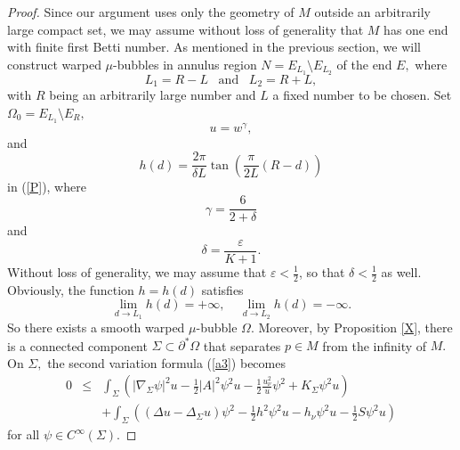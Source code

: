 \documentclass[10pt,a4paper]{amsart}
\numberwithin{equation}{section}
\begin{document}
\begin{proof}
Since our argument uses only the geometry of $M$ outside an arbitrarily large compact
set, we may assume without loss of generality that $M$ has one end with
finite first Betti number.
As mentioned in the previous section, we will construct warped
$\mu$-bubbles in annulus region $N=E_{L_1}\setminus E_{L_2}$ of the end $E,$
where $$L_1=R-L \;\;\;\text{and}\;\;\; L_2=R+L,$$ with $R$ being an arbitrarily large number and $L$ a fixed number
to be chosen. Set $\Omega_0=E_{L_1}\setminus E_{R},$ $$u=w^{\gamma },$$ and 
\begin{equation*}
h\left( d\right) =\frac{2\pi }{\delta L}\tan \left( \frac{\pi }{2L}(R-d)\right)
\end{equation*} 
in (\ref{P}), where 
\begin{equation*}
\gamma =\frac{6}{2+\delta }
\end{equation*}
and 
\begin{equation*}
\delta =\frac{\varepsilon }{K+1}.
\end{equation*}
Without loss of generality, we may assume that $\varepsilon<\frac{1}{2}$, so  that $\delta <\frac{1}{2}$ as well. 
Obviously, the function $h=h\left( d\right) $ satisfies
\begin{equation*}
\lim_{d\rightarrow L_1}h\left( d\right) =+\infty ,\ \ \ \ \
\lim_{d\rightarrow L_2}h\left( d\right) =-\infty .  
\end{equation*}
So there exists a smooth warped $\mu$-bubble $\Omega.$ Moreover, by Proposition \ref{X},
there is a connected component $\Sigma \subset \partial ^{\ast }\Omega $
that separates $p\in M$ from the infinity of $M.$ On $\Sigma,$ the second variation formula (\ref{a3}) becomes
\begin{eqnarray*}
0 &\leq &\int_{\Sigma}\left( \left\vert \nabla _{\Sigma
}\psi \right\vert ^{2}u-\frac{1}{2}\left\vert A\right\vert ^{2}\psi ^{2}u-%
\frac{1}{2}\frac{u_{\nu }^{2}}{u}\psi ^{2}+K_{\Sigma}\psi
^{2}u\right) \\
&&+\int_{\Sigma }\left( \left( \Delta u-\Delta _{\Sigma}u\right) \psi ^{2}-\frac{1}{2}h^{2}\psi ^{2}u-h_{\nu }\psi
^{2}u-\frac{1}{2}S\psi ^{2}u\right)
\end{eqnarray*}%
for all $\psi \in C^{\infty }\left( \Sigma \right).$ 


\end{proof}
\end{document}
